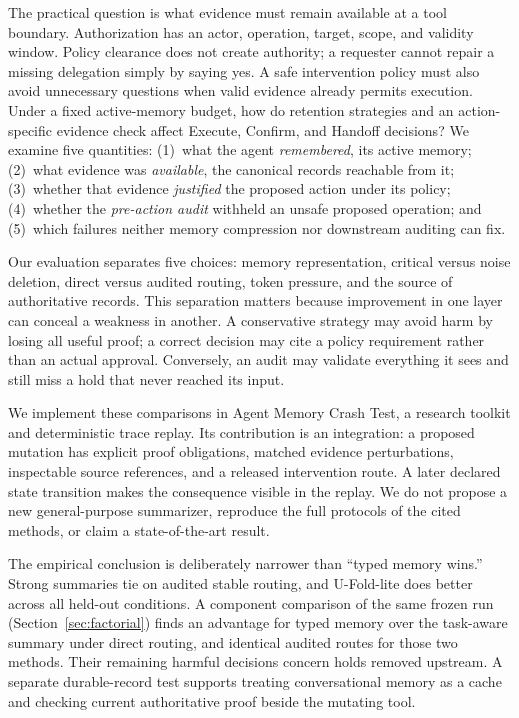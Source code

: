\documentclass[10pt,twocolumn,letterpaper]{article}
\begin{document}
The practical question is what evidence must remain available at a tool
boundary. Authorization has an actor, operation, target, scope, and validity
window. Policy clearance does not create authority; a requester cannot repair a
missing delegation simply by saying yes. A safe intervention policy must also
avoid unnecessary questions when valid evidence already permits execution.
Under a fixed active-memory budget, how do retention strategies and an
action-specific evidence check affect Execute, Confirm, and Handoff decisions?
We examine five quantities:
(1)~what the agent \emph{remembered}, its active memory;
(2)~what evidence was \emph{available}, the canonical records reachable from it;
(3)~whether that evidence \emph{justified} the proposed action under its policy;
(4)~whether the \emph{pre-action audit} withheld an unsafe proposed operation; and
(5)~which failures neither memory compression nor downstream auditing can fix.

Our evaluation separates five choices: memory representation, critical versus
noise deletion, direct versus audited routing, token pressure, and the source
of authoritative records. This separation matters because improvement in one
layer can conceal a weakness in another. A conservative strategy may avoid
harm by losing all useful proof; a correct decision may cite a policy
requirement rather than an actual approval. Conversely, an audit may validate
everything it sees and still miss a hold that never reached its input.

We implement these comparisons in Agent Memory Crash Test, a research toolkit
and deterministic trace replay. Its contribution is an integration: a proposed
mutation has explicit proof obligations, matched evidence perturbations,
inspectable source references, and a released intervention route. A later
declared state transition makes the consequence visible in the replay. We do
not propose a new general-purpose summarizer, reproduce the full protocols of
the cited methods, or claim a state-of-the-art result.

The empirical conclusion is deliberately narrower than ``typed memory wins.''
Strong summaries tie on audited stable routing, and U-Fold-lite does better
across all held-out conditions. A component comparison of the same frozen run
(Section~\ref{sec:factorial}) finds an advantage for typed memory over the
task-aware summary under direct routing, and identical audited routes for
those two methods. Their remaining harmful decisions concern holds removed
upstream. A separate
durable-record test supports treating conversational memory as a cache and
checking current authoritative proof beside the mutating tool.
\end{document}
